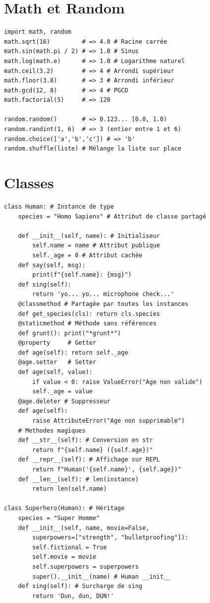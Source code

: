 \documentclass{article}
\begin{document}
\begin{multicols*}{4}
\section*{Math et Random}
\begin{lstlisting}
import math, random
math.sqrt(16)         # => 4.0 # Racine carrée
math.sin(math.pi / 2) # => 1.0 # Sinus
math.log(math.e)      # => 1.0 # Logarithme naturel
math.ceil(3.2)        # => 4 # Arrondi supérieur
math.floor(3.8)       # => 3 # Arrondi inférieur
math.gcd(12, 8)       # => 4 # PGCD
math.factorial(5)     # => 120

random.random()       # => 0.123... [0.0, 1.0)
random.randint(1, 6)  # => 3 (entier entre 1 et 6)
random.choice(['a','b','c']) # => 'b'
random.shuffle(liste) # Mélange la liste sur place
\end{lstlisting}

\section*{Classes}
\begin{lstlisting}
class Human: # Instance de type
    species = "Homo Sapiens" # Attribut de classe partagé

    def __init__(self, name): # Initialiseur
        self.name = name # Attribut publique
        self._age = 0 # Attribut cachée
    def say(self, msg):
        print(f"{self.name}: {msg}")
    def sing(self):
        return 'yo... yo... microphone check...'
    @classmethod # Partagée par toutes les instances
    def get_species(cls): return cls.species
    @staticmethod # Méthode sans références
    def grunt(): print("*grunt*")
    @property     # Getter
    def age(self): return self._age
    @age.setter   # Setter
    def age(self, value):
        if value < 0: raise ValueError("Age non valide")
        self._age = value
    @age.deleter # Suppresseur
    def age(self):
        raise AttributeError("Age non supprimable")
    # Methodes magiques
    def __str__(self): # Conversion en str
        return f"{self.name} ({self.age})"
    def __repr__(self): # Affichage sur REPL
        return f"Human('{self.name}', {self.age})"
    def __len__(self): # len(instance)
        return len(self.name)

class Superhero(Human): # Héritage
    species = "Super Homme"
    def __init__(self, name, movie=False,
        superpowers=["strength", "bulletproofing"]):
        self.fictional = True
        self.movie = movie
        self.superpowers = superpowers
        super().__init__(name) # Human __init__
    def sing(self): # Surcharge de sing
        return 'Dun, dun, DUN!'


\end{lstlisting}
\end{multicols*}
\end{document}
